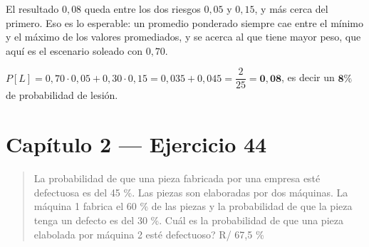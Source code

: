 \documentclass[11pt]{article}
\begin{document}
\begin{sol}
\begin{nota}
El resultado $0{,}08$ queda entre los dos riesgos $0{,}05$ y $0{,}15$, y m\'as cerca del primero. Eso es lo esperable: un promedio ponderado siempre cae entre el m\'inimo y el m\'aximo de los valores promediados, y se acerca al que tiene mayor peso, que aqu\'i es el escenario soleado con $0{,}70$.
\end{nota}

\end{sol}

\begin{resp}
$P[L]=0{,}70\cdot 0{,}05+0{,}30\cdot 0{,}15=0{,}035+0{,}045=\dfrac{2}{25}=\mathbf{0{,}08}$, es decir un $\mathbf{8\%}$ de probabilidad de lesi\'on.
\end{resp}

\section*{Cap\'itulo 2 --- Ejercicio 44}

\begin{quote}
La probabilidad de que una pieza fabricada por una empresa est\'e defectuosa es del 45 \%. Las piezas son elaboradas por dos m\'aquinas. La m\'aquina 1 fabrica el 60 \% de las piezas y la probabilidad de que la pieza tenga un defecto es del 30 \%. Cu\'al es la probabilidad de que una pieza elabolada por m\'aquina 2 est\'e defectuoso? \hfill R/ 67,5 \%
\end{quote}
\end{document}
